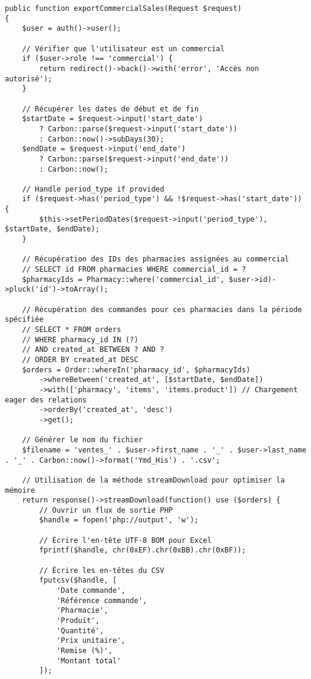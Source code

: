 \documentclass[12pt,a4paper]{article}
\begin{document}
\begin{lstlisting}[caption=Méthode exportCommercialSales]
public function exportCommercialSales(Request $request)
{
    $user = auth()->user();
    
    // Vérifier que l'utilisateur est un commercial
    if ($user->role !== 'commercial') {
        return redirect()->back()->with('error', 'Accès non autorisé');
    }
    
    // Récupérer les dates de début et de fin
    $startDate = $request->input('start_date') 
        ? Carbon::parse($request->input('start_date')) 
        : Carbon::now()->subDays(30);
    $endDate = $request->input('end_date') 
        ? Carbon::parse($request->input('end_date')) 
        : Carbon::now();
    
    // Handle period_type if provided
    if ($request->has('period_type') && !$request->has('start_date')) {
        $this->setPeriodDates($request->input('period_type'), $startDate, $endDate);
    }
    
    // Récupération des IDs des pharmacies assignées au commercial
    // SELECT id FROM pharmacies WHERE commercial_id = ?
    $pharmacyIds = Pharmacy::where('commercial_id', $user->id)->pluck('id')->toArray();
    
    // Récupération des commandes pour ces pharmacies dans la période spécifiée
    // SELECT * FROM orders 
    // WHERE pharmacy_id IN (?) 
    // AND created_at BETWEEN ? AND ?
    // ORDER BY created_at DESC
    $orders = Order::whereIn('pharmacy_id', $pharmacyIds)
        ->whereBetween('created_at', [$startDate, $endDate])
        ->with(['pharmacy', 'items', 'items.product']) // Chargement eager des relations
        ->orderBy('created_at', 'desc')
        ->get();
    
    // Générer le nom du fichier
    $filename = 'ventes_' . $user->first_name . '_' . $user->last_name . '_' . Carbon::now()->format('Ymd_His') . '.csv';
    
    // Utilisation de la méthode streamDownload pour optimiser la mémoire
    return response()->streamDownload(function() use ($orders) {
        // Ouvrir un flux de sortie PHP
        $handle = fopen('php://output', 'w');
        
        // Écrire l'en-tête UTF-8 BOM pour Excel
        fprintf($handle, chr(0xEF).chr(0xBB).chr(0xBF));
        
        // Écrire les en-têtes du CSV
        fputcsv($handle, [
            'Date commande',
            'Référence commande',
            'Pharmacie',
            'Produit',
            'Quantité',
            'Prix unitaire',
            'Remise (%)',
            'Montant total'
        ]);
        

\end{lstlisting}
\end{document}
